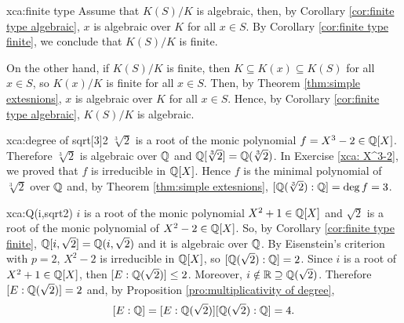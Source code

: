 \begin{sol}{xca:finite type}
    Assume that $K(S)/K$ is algebraic, then, by Corollary \ref{cor:finite type algebraic}, 
    $x$ is algebraic over $K$ for all $x\in S$.
    By Corollary \ref{cor:finite type finite}, we conclude that $K(S)/K$ is finite.

    On the other hand, if $K(S)/K$ is finite, then
    $K\subseteq K(x)\subseteq K(S)$ for all $x\in S$, so
    $K(x)/K$ is finite for all $x\in S$.
    Then, by Theorem \ref{thm:simple extesnions},
    $x$ is algebraic over $K$ for all $x\in S$.
    Hence, by Corollary \ref{cor:finite type algebraic}, $K(S)/K$ is algebraic.
 \end{sol}

\begin{sol}{xca:degree of sqrt[3]2}
    $\sqrt[3]{2}$ is a root of the monic polynomial $f=X^3-2\in \mathbb{Q}[X]$.
    Therefore $\sqrt[3]{2}$ is algebraic over $\mathbb{Q}$ 
    and $\mathbb{Q}[\sqrt[3]{2}]=\mathbb{Q}(\sqrt[3]{2})$.
    In Exercise \ref{xca: X^3-2}, we proved that
    $f$ is irreducible in $\mathbb{Q}[X]$.
    Hence $f$ is the minimal polynomial of $\sqrt[3]{2}$
    over $\mathbb{Q}$ and, by Theorem \ref{thm:simple extesnions},
    $[\mathbb{Q}(\sqrt[3]{2}):\mathbb{Q}]=\deg f=3$.
\end{sol}

\begin{sol}{xca:Q(i,sqrt2)}
    $i$ is a root of the monic polynomial $X^2+1\in\mathbb{Q}[X]$
    and $\sqrt{2}$ is a root of the monic polynomial of 
    $X^2-2\in\mathbb{Q}[X]$.
    So, by Corollary \ref{cor:finite type finite},
     $\mathbb{Q}[i,\sqrt{2}]=\mathbb{Q}(i,\sqrt{2})$ and it is algebraic over $\mathbb{Q}$.
    By Eisenstein's criterion with $p=2$,
    $X^2-2$ is irreducible in $\mathbb{Q}[X]$, so 
    $[\mathbb{Q}(\sqrt{2}):\mathbb{Q}]=2$.
    Since $i$ is a root of $X^2+1\in\mathbb{Q}[X]$,
    then $[E:\mathbb{Q}(\sqrt{2})]\leq 2$.
    Moreover, $i\notin \mathbb{R}\supseteq \mathbb{Q}(\sqrt{2})$.
    Therefore $[E:\mathbb{Q}(\sqrt{2})]=2$ and,
    by Proposition \ref{pro:multiplicativity of degree},
    \[
    [E:\mathbb{Q}]=[E:\mathbb{Q}(\sqrt{2})][\mathbb{Q}(\sqrt{2}):\mathbb{Q}]=4.
    \]
\end{sol}

